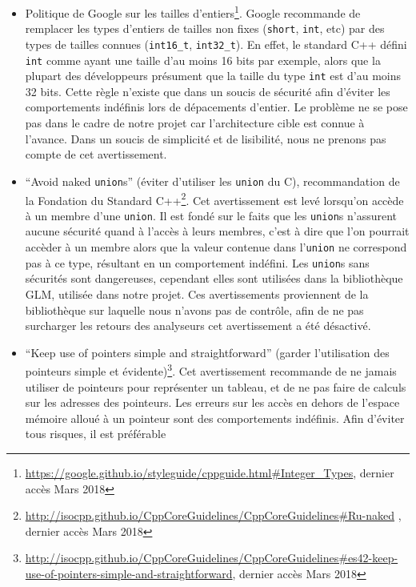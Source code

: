 \begin{itemize}
\item
  Politique de Google sur les tailles
  d'entiers\footnote{\url{https://google.github.io/styleguide/cppguide.html\#Integer_Types}, dernier accès Mars 2018}. Google recommande de remplacer
  les types d'entiers de tailles non fixes (\texttt{short},
  \texttt{int}, etc) par des types de tailles connues
  (\texttt{int16\_t}, \texttt{int32\_t}). En effet, le standard C++
  défini \texttt{int} comme ayant une taille d'au moins 16 bits par
  exemple, alors que la plupart des développeurs présument que la taille
  du type \texttt{int} est d'au moins 32 bits. Cette règle n'existe que
  dans un soucis de sécurité afin d'éviter les comportements indéfinis
  lors de dépacements d'entier. Le problème ne se pose pas dans le cadre
  de notre projet car l'architecture cible est connue à l'avance. Dans
  un soucis de simplicité et de lisibilité, nous ne prenons pas compte
  de cet avertissement.
\item
  ``Avoid naked \texttt{union}s'' (éviter d'utiliser les \texttt{union}
  du C), recommandation de la Fondation du Standard
  C++\footnote{\url{http://isocpp.github.io/CppCoreGuidelines/CppCoreGuidelines\#Ru-naked} , dernier accès Mars 2018}. Cet avertissement est levé
  lorsqu'on accède à un membre d'une \texttt{union}. Il est fondé sur le
  faits que les \texttt{union}s n'assurent aucune sécurité quand à
  l'accès à leurs membres, c'est à dire que l'on pourrait accèder à un
  membre alors que la valeur contenue dans l'\texttt{union} ne
  correspond pas à ce type, résultant en un comportement indéfini. Les
  \texttt{union}s sans sécurités sont dangereuses, cependant elles sont
  utilisées dans la bibliothèque GLM, utilisée dans notre projet. Ces
  avertissements proviennent de la bibliothèque sur laquelle nous
  n'avons pas de contrôle, afin de ne pas surcharger les retours des
  analyseurs cet avertissement a été désactivé.
\item
  ``Keep use of pointers simple and straightforward'' (garder
  l'utilisation des pointeurs simple et
  évidente)\footnote{\url{http://isocpp.github.io/CppCoreGuidelines/CppCoreGuidelines\#es42-keep-use-of-pointers-simple-and-straightforward}, dernier accès Mars 2018}. Cet avertissement recommande de
  ne jamais utiliser de pointeurs pour représenter un tableau, et de ne
  pas faire de calculs sur les adresses des pointeurs. Les erreurs sur
  les accès en dehors de l'espace mémoire alloué à un pointeur sont des
  comportements indéfinis. Afin d'éviter tous risques, il est préférable

\end{itemize}
